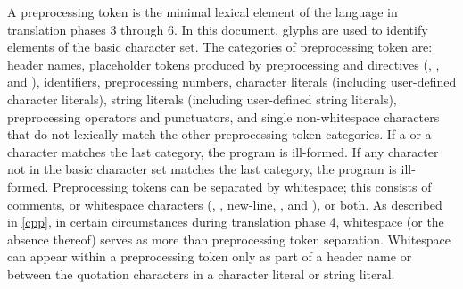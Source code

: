 \pnum
A preprocessing token is the minimal lexical element of the language in translation
phases 3 through 6.
In this document,
glyphs are used to identify
elements of the basic character set.
The categories of preprocessing token are: header names,
placeholder tokens produced by preprocessing  and  directives
(, , and ),
identifiers, preprocessing numbers, character literals (including user-defined character
literals), string literals (including user-defined string literals), preprocessing
operators and punctuators, and single non-whitespace characters that do not lexically
match the other preprocessing token categories.
If a  or a  character
matches the last category, the program is ill-formed.
If any character not in the basic character set matches the last category,
the program is ill-formed.
Preprocessing tokens can be separated by
%
whitespace;
%
this consists of comments, or whitespace characters
(,
,
new-line,
, and
), or both.
As described in \ref{cpp}, in certain
circumstances during translation phase 4, whitespace (or the absence
thereof) serves as more than preprocessing token separation. Whitespace
can appear within a preprocessing token only as part of a header name or
between the quotation characters in a character literal or
string literal.

